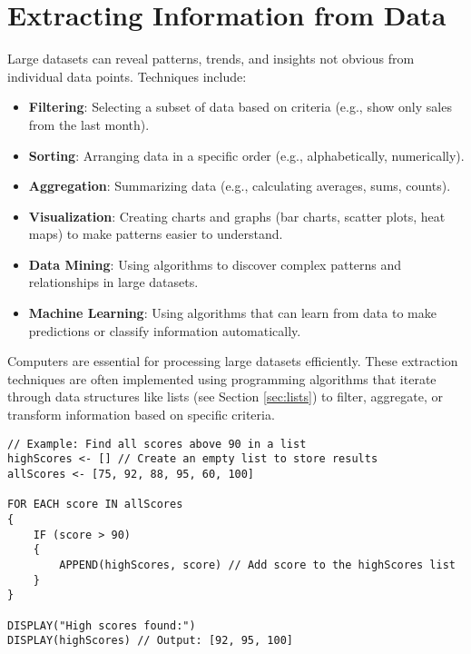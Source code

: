 \documentclass[11pt,oneside]{book}
\begin{document}
\section{Extracting Information from Data}
\label{sec:extracting_info}
Large datasets can reveal patterns, trends, and insights not obvious from individual data points. Techniques include:
\begin{itemize}
    \item \textbf{Filtering}: Selecting a subset of data based on criteria (e.g., show only sales from the last month).
    \item \textbf{Sorting}: Arranging data in a specific order (e.g., alphabetically, numerically).
    \item \textbf{Aggregation}: Summarizing data (e.g., calculating averages, sums, counts).
    \item \textbf{Visualization}: Creating charts and graphs (bar charts, scatter plots, heat maps) to make patterns easier to understand.
    \item \textbf{Data Mining}: Using algorithms to discover complex patterns and relationships in large datasets.
    \item \textbf{Machine Learning}: Using algorithms that can learn from data to make predictions or classify information automatically.
\end{itemize}
Computers are essential for processing large datasets efficiently. These extraction techniques are often implemented using programming algorithms that iterate through data structures like lists (see Section \ref{sec:lists}) to filter, aggregate, or transform information based on specific criteria.

\begin{lstlisting}[language={}, label={lst:data_filtering_example}, caption={AP Pseudocode: Filtering Data in a List}]
// Example: Find all scores above 90 in a list
highScores <- [] // Create an empty list to store results
allScores <- [75, 92, 88, 95, 60, 100]

FOR EACH score IN allScores
{
    IF (score > 90)
    {
        APPEND(highScores, score) // Add score to the highScores list
    }
}

DISPLAY("High scores found:")
DISPLAY(highScores) // Output: [92, 95, 100]
\end{lstlisting}
\end{document}

